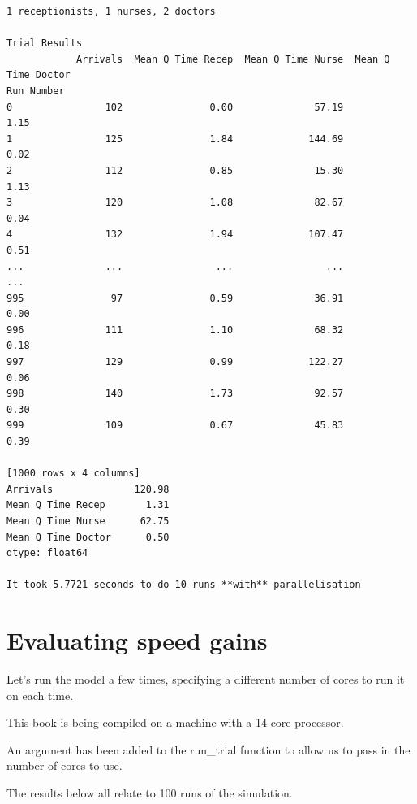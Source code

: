 \documentclass[
  letterpaper,
  DIV=11,
  numbers=noendperiod]{scrreprt}
\begin{document}
\begin{verbatim}
1 receptionists, 1 nurses, 2 doctors

Trial Results
            Arrivals  Mean Q Time Recep  Mean Q Time Nurse  Mean Q Time Doctor
Run Number                                                                    
0                102               0.00              57.19                1.15
1                125               1.84             144.69                0.02
2                112               0.85              15.30                1.13
3                120               1.08              82.67                0.04
4                132               1.94             107.47                0.51
...              ...                ...                ...                 ...
995               97               0.59              36.91                0.00
996              111               1.10              68.32                0.18
997              129               0.99             122.27                0.06
998              140               1.73              92.57                0.30
999              109               0.67              45.83                0.39

[1000 rows x 4 columns]
Arrivals              120.98
Mean Q Time Recep       1.31
Mean Q Time Nurse      62.75
Mean Q Time Doctor      0.50
dtype: float64

It took 5.7721 seconds to do 10 runs **with** parallelisation
\end{verbatim}

\section{Evaluating speed gains}\label{evaluating-speed-gains}

Let's run the model a few times, specifying a different number of cores
to run it on each time.

This book is being compiled on a machine with a 14 core processor.

An argument has been added to the run\_trial function to allow us to
pass in the number of cores to use.

The results below all relate to 100 runs of the simulation.
\end{document}
